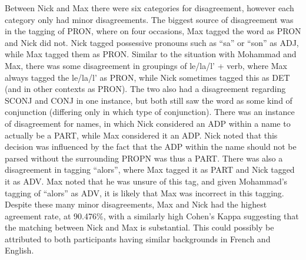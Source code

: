 \documentclass{article}\usepackage[]{graphicx}\usepackage[]{color}
\begin{document}
Between Nick and Max there were six categories for disagreement, however each category only had minor disagreements. The biggest source of disagreement was in the tagging of PRON, where on four occasions, Max tagged the word as PRON and Nick did not. Nick tagged possessive pronouns such as “sa” or “son” as ADJ, while Max tagged them as PRON. Similar to the situation with Mohammad and Max, there was some disagreement in groupings of le/la/l' + verb, where Max always tagged the le/la/l' as PRON, while Nick sometimes tagged this as DET (and in other contexts as PRON). The two also had a disagreement regarding SCONJ and CONJ in one instance, but both still saw the word as some kind of conjunction (differing only in which type of conjunction). There was an instance of disagreement for names, in which Nick considered an ADP within a name to actually be a PART, while Max considered it an ADP. Nick noted that this decision was influenced by the fact that the ADP within the name should not be parsed without the surrounding PROPN was thus a PART. There was also a disagreement in tagging “alors”, where Max tagged it as PART and Nick tagged it as ADV. Max noted that he was unsure of this tag, and given Mohammad's tagging of “alors” as ADV, it is likely that Max was incorrect in this tagging. Despite these many minor disagreements, Max and Nick had the highest agreement rate, at 90.476\%, with a similarly high Cohen's Kappa suggesting that the matching between Nick and Max is substantial. This could possibly be attributed to both participants having similar backgrounds in French and English. 
\end{document}

